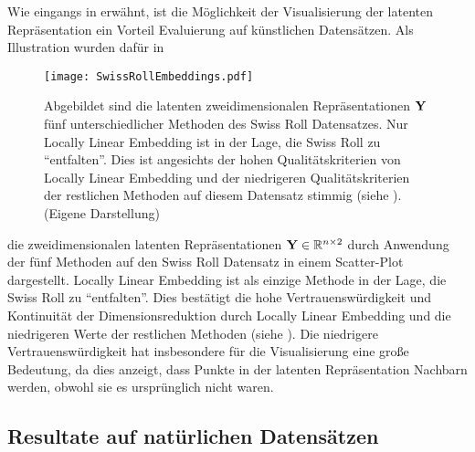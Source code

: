 Wie eingangs in  erwähnt, ist die
Möglichkeit der Visualisierung der latenten Repräsentation ein Vorteil Evaluierung auf künstlichen
Datensätzen. Als Illustration wurden dafür in 
\begin{figure}[ht]
	\centering
	\texttt{[image: SwissRollEmbeddings.pdf]}
	\caption[Latente zweidimensionale Repräsentation $\mat{Y}$ fünf unterschiedlicher Methodes des Swiss Roll Datensatzes.]{Abgebildet sind die latenten zweidimensionalen Repräsentationen $\mat{Y}$ fünf unterschiedlicher Methoden des Swiss Roll Datensatzes. Nur Locally Linear Embedding ist in der Lage, die Swiss Roll zu \enquote{entfalten}. Dies ist angesichts der hohen Qualitätskriterien von Locally Linear Embedding und der niedrigeren Qualitätskriterien der restlichen Methoden auf diesem Datensatz stimmig (siehe ). (Eigene Darstellung)}
	\label{fig:SwissRollEmbeddings}
\end{figure}
die zweidimensionalen latenten Repräsentationen $\mathbf{Y} \in \mathbb{R}^{n \times 2}$ durch Anwendung der fünf Methoden auf den Swiss Roll Datensatz in einem Scatter-Plot dargestellt. Locally Linear Embedding ist als einzige Methode in der Lage, die Swiss Roll zu \enquote{entfalten}. Dies bestätigt die hohe Vertrauenswürdigkeit und Kontinuität der Dimensionsreduktion durch Locally Linear Embedding und die niedrigeren Werte der restlichen Methoden (siehe ). Die niedrigere Vertrauenswürdigkeit hat insbesondere für die Visualisierung eine große Bedeutung, da dies anzeigt, dass Punkte in der latenten Repräsentation Nachbarn werden, obwohl sie es ursprünglich nicht waren.

\subsection{Resultate auf natürlichen Datensätzen}
\label{ch:Vergleich:sec:Resultate:natuerlich}

